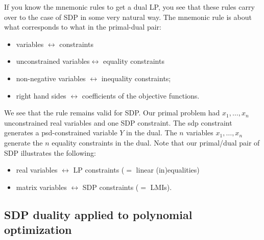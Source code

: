 \begin{remark}
	If you know the mnemonic rules to get a dual LP, you see that these rules carry over to the case of SDP in some very natural way. The mnemonic rule is about what corresponds to what in the primal-dual pair:
	\begin{itemize}
		\item variables $\leftrightarrow$ constraints
		\item unconstrained variables$\leftrightarrow$ equality constraints
		\item non-negative variables $\leftrightarrow$ inequality constraints;
		\item right hand sides $\leftrightarrow$ coefficients of the objective functions. 
	\end{itemize}
	We see that the rule remains valid for SDP.
	Our primal problem had $x_1,\ldots,x_n$ unconstrained real variables and one SDP constraint. The sdp constraint generates a psd-constrained variable $Y$ in the dual. The $n$ variables $x_1,\ldots,x_n$ generate the $n$ equality constraints in the dual. Note that our primal/dual pair of SDP illustrates the following: 
	\begin{itemize}
		\item real variables $\leftrightarrow$ LP constraints ($=$ linear (in)equalities)
		\item matrix variables $\leftrightarrow$ SDP constraints ($=$ LMIs).
	\end{itemize}
\end{remark}

\subsection{SDP duality applied to polynomial optimization}

